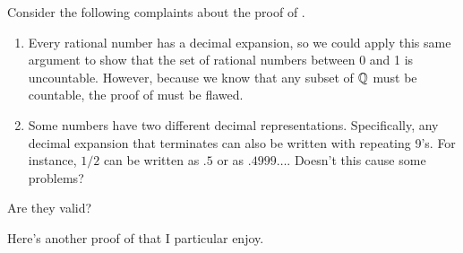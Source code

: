 \documentclass[11pt,twoside=off,numbers=noenddot]{scrbook}
\begin{document}
\begin{remark}
    Consider the following complaints about the proof of .

    \begin{enumerate}
        \item Every rational number has a decimal expansion, so we could apply this same argument to show that the set of rational numbers between 0 and 1 is uncountable. However, because we know that any subset of $\mathbb Q$ must be countable, the proof of  must be flawed.
        \item Some numbers have two different decimal representations. Specifically, any decimal expansion that terminates can also be written with repeating 9's. For instance, $1/2$ can be written as $.5$ or as $.4999\dots$. Doesn't this cause some problems?
    \end{enumerate}

    Are they valid?
\end{remark}

Here's another proof of  that I particular enjoy.
\end{document}
